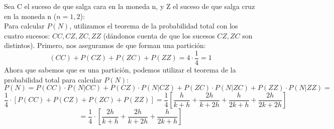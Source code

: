 \documentclass[a4paper,12pt]{article}
\begin{document}
\begin{enumerate}[label=\textbf{\arabic*.}]
    Sea C el suceso de que salga cara en la moneda n, y Z el suceso de que salga cruz en la moneda n ($n=1,2$):\\

    Para calcular $P(N)$, utilizamos el teorema de la probabilidad total con los cuatro sucesos: $CC, CZ,ZC,ZZ$ (dándonos cuenta de que los sucesos $CZ,ZC$ son distintos). Primero, nos aseguramos de que forman una partición:\\
    \[(CC)+P(CZ)+P(ZC)+P(ZZ)=4\cdot\frac{1}{4}=1\]
    Ahora que sabemos que es una partición, podemos utilizar el teorema de la probabilidad total para calcular $P(N)$:
    \[P(N)=P(CC)\cdot P(N|CC)+P(CZ)\cdot P(N|CZ)+P(ZC)\cdot P(N|ZC)+P(ZZ)\cdot P(N|ZZ) = \]
    \[\frac{1}{4}\cdot [P(CC)+P(CZ)+P(ZC)+P(ZZ)]=\frac{1}{4}[\frac{h}{k+h}+\frac{2h}{k+2h}+\frac{h}{2k+h}+\frac{2h}{2k+2h}]\]
    \[=\frac{1}{4}\cdot[\frac{2h}{k+h}+\frac{2h}{k+2h}+\frac{h}{2k+h}]\]
    
    \end{enumerate}
    
\end{document}
